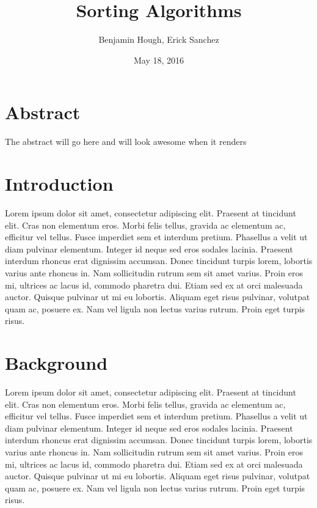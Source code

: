 \documentclass[12pt]{article}
\title{Sorting Algorithms}
\author{Benjamin Hough, Erick Sanchez}
\date{May 18, 2016}
\begin{document}
	\maketitle
	\section*{Abstract}
	The abstract will go here and will look awesome when it renders

	\tableofcontents
	\pagebreak
	


	\section{Introduction}
	Lorem ipsum dolor sit amet, consectetur adipiscing elit. Praesent at tincidunt elit. Cras non elementum eros. Morbi felis tellus, gravida ac elementum ac, efficitur vel tellus. Fusce imperdiet sem et interdum pretium. Phasellus a velit ut diam pulvinar elementum. Integer id neque sed eros sodales lacinia. Praesent interdum rhoncus erat dignissim accumsan. Donec tincidunt turpis lorem, lobortis varius ante rhoncus in. Nam sollicitudin rutrum sem sit amet varius. Proin eros mi, ultrices ac lacus id, commodo pharetra dui. Etiam sed ex at orci malesuada auctor. Quisque pulvinar ut mi eu lobortis. Aliquam eget risus pulvinar, volutpat quam ac, posuere ex. Nam vel ligula non lectus varius rutrum. Proin eget turpis risus.
	
	
	\section{Background}
	Lorem ipsum dolor sit amet, consectetur adipiscing elit. Praesent at tincidunt elit. Cras non elementum eros. Morbi felis tellus, gravida ac elementum ac, efficitur vel tellus. Fusce imperdiet sem et interdum pretium. Phasellus a velit ut diam pulvinar elementum. Integer id neque sed eros sodales lacinia. Praesent interdum rhoncus erat dignissim accumsan. Donec tincidunt turpis lorem, lobortis varius ante rhoncus in. Nam sollicitudin rutrum sem sit amet varius. Proin eros mi, ultrices ac lacus id, commodo pharetra dui. Etiam sed ex at orci malesuada auctor. Quisque pulvinar ut mi eu lobortis. Aliquam eget risus pulvinar, volutpat quam ac, posuere ex. Nam vel ligula non lectus varius rutrum. Proin eget turpis risus.
	
	
\end{document}
